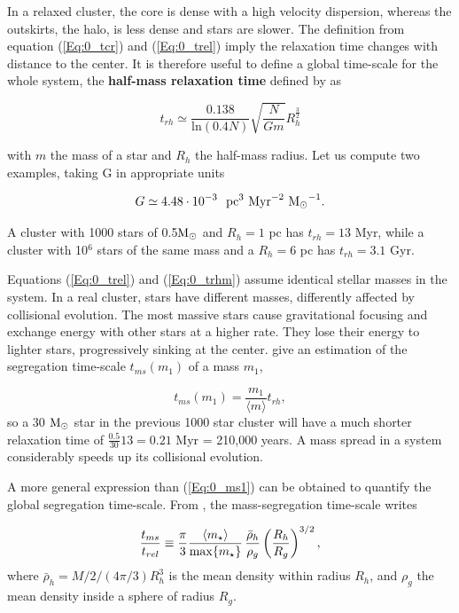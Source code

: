 In a relaxed cluster, the core is dense with a high velocity dispersion, whereas the outskirts, the halo, is less dense and stars are slower. The definition from equation (\ref{Eq:0_tcr}) and (\ref{Eq:0_trel}) imply the relaxation time changes with distance to the center. It is therefore useful to define a global time-scale for the whole system, the \textbf{half-mass relaxation time} defined by \cite{Heggie2003} as


\begin{equation}
\label{Eq:0_trhm}
t_{rh} \simeq   \frac{0.138}{\textrm{ln}(0.4 N)} \sqrt{ \frac{N}{G m}} R_h^\frac{3}{2}
\end{equation}

with $m$ the mass of a star and $R_h$ the half-mass radius. Let us compute two examples, taking G in appropriate units

\begin{equation}
G \simeq 4.48 \cdot 10^{-3}~~ \textrm{pc}^3 ~\textrm{Myr}^{-2} ~{\textrm{M}_\odot}^{-1}.
\end{equation}

A cluster with 1000 stars of 0.5${\textrm{M}_\odot}$ and $R_{h} = 1$ pc has $t_{rh} = 13$ Myr, while a cluster with 10$^6$ stars of the same mass and a $R_{h} = 6$ pc has $t_{rh} = 3.1$ Gyr.


Equations (\ref{Eq:0_trel}) and (\ref{Eq:0_trhm}) assume identical stellar masses in the system. In a real cluster, stars have different masses, differently affected by collisional evolution. The most massive stars cause gravitational focusing and exchange energy with other stars at a higher rate. They lose their energy to lighter stars, progressively sinking at the center. \cite{Heggie2003} give an estimation of the segregation time-scale $t_{ms}(m_1)$ of a mass $m_1$,

\begin{equation}
\label{Eq:0_ms1}
t_{ms}(m_1) = \frac{m_1}{\langle m \rangle} t_{rh},
\end{equation} 
so a 30 ${\textrm{M}_\odot}$ star in the previous 1000 star cluster will have a much shorter relaxation time of $\frac{0.5}{30} 13 = 0.21$ Myr = 210,000 years. A mass spread in a system considerably speeds up its collisional evolution.

A more general expression than (\ref{Eq:0_ms1}) can be obtained to quantify the global segregation time-scale. From \cite{Fleck2006}, the mass-segregation time-scale writes

\begin{equation}
\label{Eq:0_ms2} 
  \frac{t_{ms}}{t_{rel}} \equiv \frac{\pi}{3} \frac{\langle m_\star\rangle}{\max\{m_\star\}} \, \frac{\bar{\rho}_h}{\rho_g} \left( \frac{R_h}{R_g}\right)^{3/2} ,
\end{equation}
where $\bar{\rho}_h = M/2 /( 4\pi/3) R_h^3$ is the mean density within radius $R_h$, and $\rho_g$ the mean density inside a sphere of radius $R_g$.



